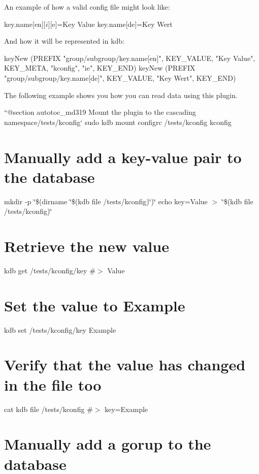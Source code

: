 An example of how a valid config file might look like\+:


\begin{DoxyCode}
[group][subgroup]
key.name[en][$i][$e]=Key Value
key.name[de]=Key Wert
\end{DoxyCode}


And how it will be represented in kdb\+:


\begin{DoxyCode}
keyNew (PREFIX "group/subgroup/key.name[en]", KEY\_VALUE, "Key Value", KEY\_META, "kconfig", "ie", KEY\_END)
keyNew (PREFIX "group/subgroup/key.name[de]", KEY\_VALUE, "Key Wert", KEY\_END)
\end{DoxyCode}


The following example shows you how you can read data using this plugin.

``{\ttfamily  @section autotoc\+\_\+md319 Mount the plugin to the cascading namespace}/tests/kconfig` sudo kdb mount configrc /tests/kconfig kconfig\hypertarget{autotoc_md317_autotoc_md320}{}\section{Manually add a key-\/value pair to the database}\label{autotoc_md317_autotoc_md320}
mkdir -\/p \char`\"{}\$(dirname \char`\"{}\$(kdb file /tests/kconfig)\char`\"{})\char`\"{} echo \textquotesingle{}key=Value\textquotesingle{} $>$ \char`\"{}\$(kdb file /tests/kconfig)\char`\"{}\hypertarget{autotoc_md317_autotoc_md321}{}\section{Retrieve the new value}\label{autotoc_md317_autotoc_md321}
kdb get /tests/kconfig/key \#$>$ Value\hypertarget{autotoc_md317_autotoc_md322}{}\section{Set the value to Example}\label{autotoc_md317_autotoc_md322}
kdb set /tests/kconfig/key Example\hypertarget{autotoc_md317_autotoc_md323}{}\section{Verify that the value has changed in the file too}\label{autotoc_md317_autotoc_md323}
cat {\ttfamily kdb file /tests/kconfig} \#$>$ key=Example\hypertarget{autotoc_md317_autotoc_md324}{}\section{Manually add a gorup to the database}\label{autotoc_md317_autotoc_md324}
